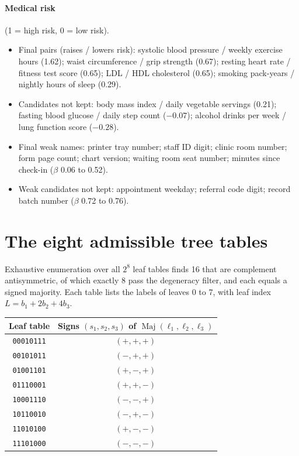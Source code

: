 \documentclass[11pt,a4paper]{article}
\newcommand{\1}{\mathbf{1}}
\DeclareMathOperator{\Maj}{Maj}
\theoremstyle{plain}
\theoremstyle{definition}
\theoremstyle{remark}
\begin{document}
\paragraph{Medical risk} (1 = high risk, 0 = low risk).
\begin{itemize}[nosep]
  \item Final pairs (raises / lowers risk): systolic blood pressure / weekly
        exercise hours (1.62); waist circumference / grip strength (0.67);
        resting heart rate / fitness test score (0.65); LDL / HDL cholesterol
        (0.65); smoking pack-years / nightly hours of sleep (0.29).
  \item Candidates not kept: body mass index / daily vegetable servings
        (0.21); fasting blood glucose / daily step count ($-0.07$); alcohol
        drinks per week / lung function score ($-0.28$).
  \item Final weak names: printer tray number; staff ID digit; clinic room
        number; form page count; chart version; waiting room seat number;
        minutes since check-in ($\beta$ 0.06 to 0.52).
  \item Weak candidates not kept: appointment weekday; referral code digit;
        record batch number ($\beta$ 0.72 to 0.76).
\end{itemize}

\section{The eight admissible tree tables}
\label{app:tree}

Exhaustive enumeration over all $2^8$ leaf tables finds 16 that are
complement antisymmetric, of which exactly 8 pass the degeneracy filter, and
each equals a signed majority. Each table lists the labels of leaves 0 to 7,
with leaf index $L = b_1 + 2b_2 + 4b_3$.

\begin{center}
\begin{tabular}{cc}
\toprule
\textbf{Leaf table} & \textbf{Signs $(s_1, s_2, s_3)$ of $\Maj(\ell_1,\ell_2,\ell_3)$} \\
\midrule
\texttt{00010111} & $(+,+,+)$ \\
\texttt{00101011} & $(-,+,+)$ \\
\texttt{01001101} & $(+,-,+)$ \\
\texttt{01110001} & $(+,+,-)$ \\
\texttt{10001110} & $(-,-,+)$ \\
\texttt{10110010} & $(-,+,-)$ \\
\texttt{11010100} & $(+,-,-)$ \\
\texttt{11101000} & $(-,-,-)$ \\
\bottomrule
\end{tabular}
\end{center}
\end{document}
